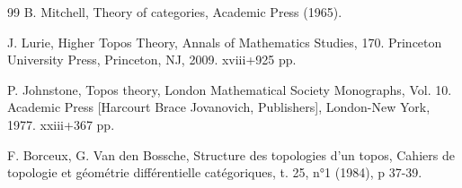 \begin{thebibliography}{99}
 B. Mitchell, Theory of categories, Academic Press
(1965).

 J. Lurie, Higher Topos Theory, Annals of Mathematics Studies, 170. Princeton University Press, 
Princeton, NJ, 2009. xviii+925 pp.

  P. Johnstone, Topos theory, 
London Mathematical Society Monographs, Vol. 10. 
Academic Press [Harcourt Brace Jovanovich, Publishers], London-New York, 1977. xxiii+367 pp.

 F. Borceux, G. Van den Bossche, Structure des topologies
d'un topos, Cahiers de topologie et géométrie différentielle catégoriques,
t. 25, n°1 (1984), p 37-39.

\end{thebibliography}

\ifx\danslelivre\undefined

\fi
